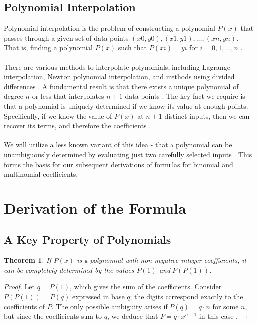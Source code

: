 \documentclass{article}
\theoremstyle{plain}
\newtheorem{thm}{Theorem}
\begin{document}
\subsection{Polynomial Interpolation}
Polynomial interpolation is the problem of constructing a polynomial $P(x)$ that passes through a given set of data points ${(x0, y0), (x1, y1), \ldots, (xn, yn)}$. That is, finding a polynomial $P(x)$ such that $P(xi) = yi$ for $i = 0, 1, \ldots, n$ \cite{burden2011numerical, kincaid2012numerical}.
\\
\\
There are various methods to interpolate polynomials, including Lagrange interpolation, Newton polynomial interpolation, and methods using divided differences \cite{burden2011numerical, kincaid2012numerical}. A fundamental result is that there exists a unique polynomial of degree \( n \) or less that interpolates \( n+1 \) data points \cite{burden2011numerical}. The key fact we require is that a polynomial is uniquely determined if we know its value at enough points. Specifically, if we know the value of \( P(x) \) at \( n+1 \) distinct inputs, then we can recover its terms, and therefore the coefficients \cite{cheney2013course}.
\\
\\
We will utilize a less known variant of this idea - that a polynomial can be unambiguously determined by evaluating just two carefully selected inputs \cite{arupinski,jcook}. This forms the basis for our subsequent derivations of formulas for binomial and multinomial coefficients.

\section{Derivation of the Formula}

\subsection{A Key Property of Polynomials}

\begin{thm}
\label{thm:1}
If $P(x)$ is a polynomial with non-negative integer coefficients, it can be completely determined by the values $P(1)$ and $P(P(1))$.
\end{thm}

\begin{proof}
Let $q = P(1)$, which gives the sum of the coefficients. Consider $P(P(1)) = P(q)$ expressed in base $q$; the digits correspond exactly to the coefficients of $P$. The only possible ambiguity arises if $P(q) = q\cdot n$ for some $n$, but since the coefficients sum to $q$, we deduce that $P = q \cdot x^{n-1}$ in this case \cite{arupinski}.
\end{proof}
\end{document}
